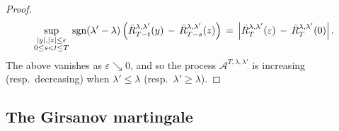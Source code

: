 \documentclass[10pt]{article}
\numberwithin{equation}{section}
\theoremstyle{definition}
\begin{document}
\begin{proof}
\begin{align*}
\sup_{\substack{ |y|,|z|\leq \varepsilon \\  0\leq s<t\leq T}}\,\textup{sgn}(\lambda'-\lambda)\, \Big( \bar{R}^{\lambda,\lambda'  }_{T-t  }(y)\,-\,\bar{R}^{\lambda,\lambda'  }_{T-s  }(z)\Big)\,=\, \Big| \bar{R}^{\lambda,\lambda'  }_{T  }(\varepsilon)\,-\,\bar{R}^{\lambda,\lambda'  }_{T  }(0)\Big|  \,.
\end{align*}
 The above vanishes as $\varepsilon \searrow 0$, and so the process $\mathcal{A}^{T,\lambda,\lambda'}$ is increasing (resp.\ decreasing) when $\lambda'\leq \lambda$ (resp.\ $ \lambda'\geq \lambda $).
\end{proof}






 




\subsection{The Girsanov martingale}\label{SubsecGirsanov}



 
\end{document}
